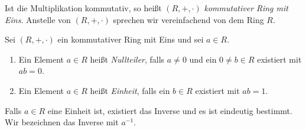 \begin{bem} %
Ist die Multiplikation kommutativ, so heißt $\left(R, +, \cdot\right)$ \textit{kommutativer Ring mit Eins}. Anstelle von $\left(R, +, \cdot\right)$ sprechen wir vereinfachend von dem Ring $R$.
\end{bem}
%
\begin{defn}\label{definitionEinheitNullteiler}
Sei $\left(R, +, \cdot\right)$ ein kommutativer Ring mit Eins und sei $a \in R$.
\begin{enumerate}
\item Ein Element $a \in R$ heißt \textit{Nullteiler}, falls $a \neq 0$ und ein $0 \neq b \in R$ existiert mit $ab =0$.
\item Ein Element $a \in R$ heißt \textit{Einheit}, falls ein $b \in R$ existiert mit $ab = 1$. 
\end{enumerate}
\end{defn}
%
%
%
\begin{bem}
Falls $a\in R$ eine Einheit ist, existiert das Inverse und es ist eindeutig bestimmt. Wir bezeichnen das Inverse mit $a^{-1}$.
\end{bem}

